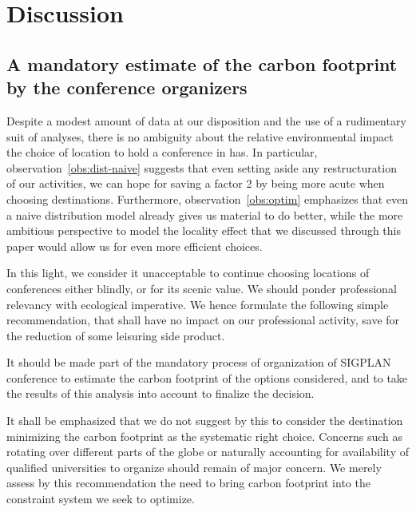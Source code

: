 \section{Discussion}
\label{sec:opinions}


\subsection{A mandatory estimate of the carbon footprint by the conference organizers}

Despite a modest amount of data at our disposition and the use of a rudimentary suit of
analyses, there is no ambiguity about the relative environmental impact the choice of
location to hold a conference in has. In particular, observation~\ref{obs:dist-naive}
suggests that even setting aside any restructuration of our activities, we can hope for
saving a factor 2 by being more acute when choosing destinations. Furthermore,
observation~\ref{obs:optim} emphasizes that even a naive distribution model already gives
us material to do better, while the more ambitious perspective to model the locality effect
that we discussed through this paper would allow us for even more efficient choices.

In this light, we consider it unacceptable to continue choosing locations of conferences
either blindly, or for its scenic value. We should ponder professional relevancy with
ecological imperative. We hence formulate the following simple recommendation, that shall
have no impact on our professional activity, save for the reduction of some leisuring side
product.

\begin{recommend}
It should be made part of the mandatory process of organization of SIGPLAN
conference to estimate the carbon footprint of the options considered, and
to take the results of this analysis into account to finalize the decision.
\end{recommend}

It shall be emphasized that we do not suggest by this to consider the destination
minimizing the carbon footprint as the systematic right choice. Concerns such as
rotating over different parts of the globe or naturally accounting for availability
of qualified universities to organize should remain of major concern. We merely
assess by this recommendation the need to bring carbon footprint into the constraint
system we seek to optimize.

